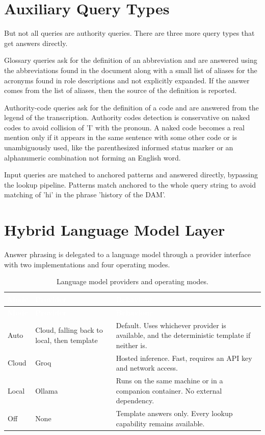\section{Auxiliary Query Types}

But not all queries are authority queries. There are three more query types that get answers directly.

Glossary queries ask for the definition of an abbreviation and are answered using the abbreviations found in the document along with a small list of aliases for the acronyms found in role descriptions and not explicitly expanded. If the answer comes from the list of aliases, then the source of the definition is reported.

Authority-code queries ask for the definition of a code and are answered from the legend of the transcription. Authority codes detection is conservative on naked codes to avoid collision of 'I' with the pronoun. A naked code becomes a real mention only if it appears in the same sentence with some other code or is unambiguously used, like the parenthesized informed status marker or an alphanumeric combination not forming an English word.

Input queries are matched to anchored patterns and answered directly, bypassing the lookup pipeline. Patterns match anchored to the whole query string to avoid matching of 'hi' in the phrase 'history of the DAM'.

\section{Hybrid Language Model Layer}

Answer phrasing is delegated to a language model through a provider interface with two implementations and four operating modes.

\begin{longtable}{|p{}|p{}|p{}|}
\caption{Language model providers and operating modes.}\label{tab:llm}\\
\hline
\rowcolor{myblue}\textcolor{white}{\textbf{Mode}} & \textcolor{white}{\textbf{Provider}} & \textcolor{white}{\textbf{Behaviour}} \\
\hline
\endfirsthead
\hline
\rowcolor{myblue}\textcolor{white}{\textbf{Mode}} & \textcolor{white}{\textbf{Provider}} & \textcolor{white}{\textbf{Behaviour}} \\
\hline
\endhead
Auto & Cloud, falling back to local, then template & Default. Uses whichever provider is available, and the deterministic template if neither is. \\ \hline
Cloud & Groq\citep{groq} & Hosted inference. Fast, requires an API key and network access. \\ \hline
Local & Ollama\citep{ollama} & Runs on the same machine or in a companion container. No external dependency. \\ \hline
Off & None & Template answers only. Every lookup capability remains available. \\ \hline
\end{longtable}

